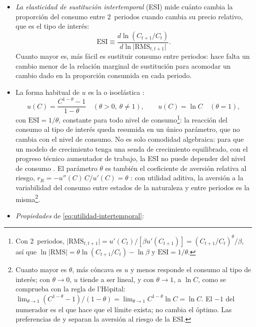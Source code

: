 \documentclass[11pt]{article}
\begin{document}
\begin{itemize}
\begin{itemize}
  \end{itemize}
\item \emph{La elasticidad de sustitución intertemporal} (ESI) mide cuánto cambia la proporción del consumo entre 2~periodos cuando cambia su precio relativo, que es el tipo de interés:
  \begin{equation*}
  \mathrm{ESI}\equiv\frac{d\ln(C_{t+1}/C_t)}{d\ln\lvert\mathrm{RMS}_{t,t+1}\rvert}.
  \end{equation*}
  Cuanto mayor es, más fácil es sustituir consumo entre periodos: hace falta un cambio menor de la relación marginal de sustitución para acomodar un cambio dado en la proporción consumida en cada periodo.
\item La forma habitual de $u$ es la  o isoelástica :
  \begin{equation}
  u(C)=\frac{C^{1-\theta}-1}{1-\theta}\quad(\theta>0,\ \theta\neq1),\qquad u(C)=\ln C\quad(\theta=1),\label{eq:crra}
  \end{equation}
  con $\mathrm{ESI}=1/\theta$, constante para todo nivel de consumo\footnote{Con 2~periodos, $\lvert\mathrm{RMS}_{t,t+1}\rvert=u'(C_t)/[\beta u'(C_{t+1})]=(C_{t+1}/C_t)^{\theta}/\beta$, así que $\ln\lvert\mathrm{RMS}\rvert=\theta\ln(C_{t+1}/C_t)-\ln\beta$ y $\mathrm{ESI}=1/\theta$.}: la reacción del consumo al tipo de interés queda resumida en un único parámetro, que no cambia con el nivel de consumo. No es solo comodidad algebraica: para que un modelo de crecimiento tenga una senda de crecimiento equilibrado, con el progreso técnico aumentador de trabajo, la ESI no puede depender del nivel de consumo\nocite{KingPlosserRebelo1988Production} . El parámetro $\theta$ es también el coeficiente de aversión relativa al riesgo, $r_R=-u''(C)\,C/u'(C)=\theta$ : con utilidad aditiva, la aversión a la variabilidad del consumo entre estados de la naturaleza y entre periodos es la misma\footnote{Cuanto mayor es $\theta$, más cóncava es $u$ y menos responde el consumo al tipo de interés; con $\theta\to0$, $u$ tiende a ser lineal, y con $\theta\to1$, a $\ln C$, como se comprueba con la regla de l'Hôpital: $\lim_{\theta\to1}(C^{1-\theta}-1)/(1-\theta)=\lim_{\theta\to1}C^{1-\theta}\ln C=\ln C$. El $-1$ del numerador es el que hace que el límite exista; no cambia el óptimo. Las preferencias de  y  separan la aversión al riesgo de la ESI.}.
\item \emph{Propiedades} de \eqref{eq:utilidad-intertemporal}\nocite{MasColellWhinstonGreen1995}:
  \begin{enumerate}

\end{enumerate}
\end{itemize}
\end{document}
